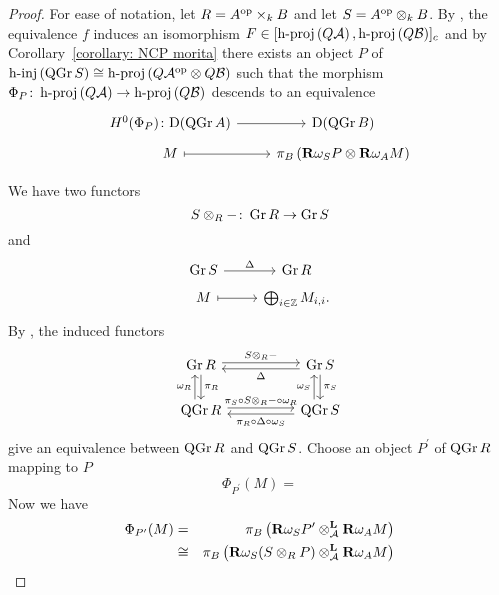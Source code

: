 \documentclass[dissertation.tex]{subfiles}
\begin{document}
\begin{proof}
  For ease of notation, let \(R = A^{\operatorname{op}} \times_k B\) and let \(S = A^{\operatorname{op}} \otimes_k B\).
  By \cite{Lunts-Orlov}, the equivalence \(f\) induces an isomorphism \(F \in [\operatorname{h-proj}\left(Q\mathcal{A}\right),\operatorname{h-proj}\left(Q\mathcal{B}\right)]_c\)
  and by Corollary~\ref{corollary: NCP morita} there exists an object \(P\) of \(\operatorname{h-inj}\left(\operatorname{QGr}S\right) \cong \operatorname{h-proj}\left(Q\mathcal{A}^{\operatorname{op}} \otimes Q\mathcal{B}\right)\) such that the morphism \(\Phi_P \colon \operatorname{h-proj}\left(Q\mathcal{A}\right) \to \operatorname{h-proj}\left(Q\mathcal{B}\right)\)
  descends to an equivalence 
  \[\begin{tikzcd}[row sep=tiny]
  H^0(\Phi_P) \colon \mathrm{D}(\QGr{A}) \arrow{r}& \mathrm{D}(\QGr{B})\\
  M \arrow[mapsto]{r} & \pi_B\left(\mathbf{R}\omega_{S} P \otimes \mathbf{R}\omega_A M \right)
  \end{tikzcd}\]
  

  We have two functors
  \[S \otimes_R - \colon \operatorname{Gr}R \to \operatorname{Gr}S\]
  and 
  \[\begin{tikzcd}[row sep=tiny]
  \Gr{S} \arrow{r}{\Delta} & \Gr{R}\\
  M \arrow[mapsto]{r} & \bigoplus_{i \in \Z} M_{i,i}.
  \end{tikzcd}\]
  By \cite[Theorem 2.4]{VR96}, the induced functors 
  \[
  \begin{tikzcd}[column sep=huge]
    \Gr{R} \arrow{d}{\pi_R}\arrow[yshift=.5ex]{r}{S \otimes_R -} & \Gr{S}\arrow{d}{\pi_S}\arrow[yshift=-.5ex]{l}{\Delta}\\
    \QGr{R}\arrow[xshift=-1ex]{u}{\omega_R} \arrow[yshift=.5ex]{r}{\pi_S \circ S \otimes_R - \circ \omega_R} & \QGr{S}\arrow[xshift=-1ex]{u}{\omega_S}\arrow[yshift=-.5ex]{l}{\pi_R \circ \Delta \circ \omega_S}
  \end{tikzcd}
  \]
  give an equivalence between \(\operatorname{QGr}R\) and \(\operatorname{QGr}S\).
  Choose an object \(P^\prime\) of \(\operatorname{QGr}R\) mapping to \(P\)
  \[\Phi_{P^\prime}(M) = \]
  Now we have
  \begin{eqnarray*}
    \Phi_{P^\prime}(M) &=& \pi_B\left(\mathbf{R}\omega_S P^\prime \otimes_{\mathcal{A}}^\mathbf{L} \mathbf{R}\omega_A M\right)\\
    &\cong& \pi_B\left(\mathbf{R}\omega_S (S \otimes_R P) \otimes_{\mathcal{A}}^\mathbf{L} \mathbf{R}\omega_A M\right)\\
  \end{eqnarray*}
    

\end{proof}
\end{document}
